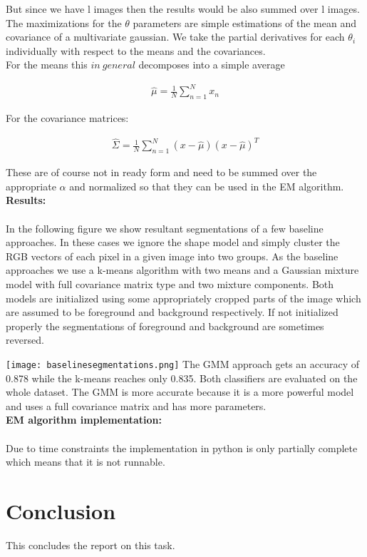 \documentclass[11pt]{article}
\begin{document}
But since we have l images then the results would be also summed over l images.\\

The maximizations for the $\theta$ parameters are simple estimations of the mean and covariance of a multivariate gaussian. We take the partial derivatives for each $\theta_i$ individually with respect to the means and the covariances.  \\
For the means this $in \ general$ decomposes into a simple average

\begin{eqnarray}
\hat{\mu} = \frac{1}{N} \sum_{n = 1}^N {x_n}
\end{eqnarray}

For the covariance matrices:

\begin{eqnarray}
\hat{\Sigma} = \frac{1}{N} \sum_{n = 1}^N { (x-\hat{\mu})(x-\hat{\mu})^T}
\end{eqnarray}

These are of course not in ready form and need to be summed over the appropriate $\alpha$ and normalized so that they can be used in the EM algorithm. \\

\textbf{Results:} \\ \\ 
In the following figure we show resultant segmentations of a few baseline approaches. 
In these cases we ignore the shape model and simply cluster the RGB vectors of each pixel in a given image into two groups. As the baseline approaches we use a k-means algorithm with two means and a Gaussian mixture model
with full covariance matrix type and two mixture components. Both models are initialized using some appropriately cropped parts of the image which are assumed to be foreground and background respectively.
If not initialized properly the segmentations of foreground and background are sometimes reversed.


\texttt{[image: baselinesegmentations.png]}
The GMM approach gets an accuracy of 0.878 while the k-means reaches only 0.835. Both classifiers are evaluated
on the whole dataset. The GMM is more accurate because it is a more powerful model and uses a full covariance matrix and has more parameters. \\ 

\textbf{EM algorithm implementation:} \\ \\ 
Due to time constraints the implementation in python is only partially complete which means that it is not runnable. 


\section{Conclusion}
This concludes the report on this task.
\end{document}

